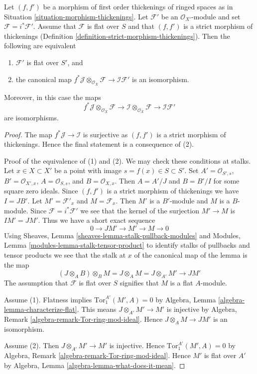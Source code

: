 \begin{lemma}
\label{lemma-deform-module}
Let $(f, f')$ be a morphism of first order thickenings of ringed spaces
as in Situation \ref{situation-morphism-thickenings}.
Let $\mathcal{F}'$ be an $\mathcal{O}_{X'}$-module
and set $\mathcal{F} = i^*\mathcal{F}'$.
Assume that $\mathcal{F}$ is flat over $S$
and that $(f, f')$ is a strict morphism of thickenings
(Definition \ref{definition-strict-morphism-thickenings}).
Then the following are equivalent
\begin{enumerate}
\item $\mathcal{F}'$ is flat over $S'$, and
\item the canonical map
$f^*\mathcal{J} \otimes_{\mathcal{O}_X} \mathcal{F} \to
\mathcal{I}\mathcal{F}'$
is an isomorphism.
\end{enumerate}
Moreover, in this case the maps
$$
f^*\mathcal{J} \otimes_{\mathcal{O}_X} \mathcal{F} \to
\mathcal{I} \otimes_{\mathcal{O}_X} \mathcal{F} \to
\mathcal{I}\mathcal{F}'
$$
are isomorphisms.
\end{lemma}

\begin{proof}
The map $f^*\mathcal{J} \to \mathcal{I}$ is surjective
as $(f, f')$ is a strict morphism of thickenings.
Hence the final statement is a consequence of (2).

\medskip\noindent
Proof of the equivalence of (1) and (2). We may check these conditions
at stalks. Let $x \in X \subset X'$
be a point with image $s = f(x) \in S \subset S'$.
Set $A' = \mathcal{O}_{S', s}$, $B' = \mathcal{O}_{X', x}$,
$A = \mathcal{O}_{S, s}$, and $B = \mathcal{O}_{X, x}$.
Then $A = A'/J$ and $B = B'/I$ for some square zero ideals.
Since $(f, f')$ is a strict morphism of thickenings we have $I = JB'$.
Let $M' = \mathcal{F}'_x$ and $M = \mathcal{F}_x$.
Then $M'$ is a $B'$-module and $M$ is a $B$-module.
Since $\mathcal{F} = i^*\mathcal{F}'$ we see that the kernel of the
surjection $M' \to M$ is $IM' = JM'$. Thus we have a short exact
sequence
$$
0 \to JM' \to M' \to M \to 0
$$
Using
Sheaves, Lemma \ref{sheaves-lemma-stalk-pullback-modules}
and
Modules, Lemma \ref{modules-lemma-stalk-tensor-product}
to identify stalks of pullbacks and tensor products we see
that the stalk at $x$ of the canonical map of the lemma is the map
$$
(J \otimes_A B) \otimes_B M = J \otimes_A M = J \otimes_{A'} M'
\longrightarrow JM'
$$
The assumption that $\mathcal{F}$ is flat over $S$ signifies that
$M$ is a flat $A$-module.

\medskip\noindent
Assume (1). Flatness implies $\text{Tor}_1^{A'}(M', A) = 0$ by
Algebra, Lemma \ref{algebra-lemma-characterize-flat}.
This means $J \otimes_{A'} M' \to M'$ is injective by
Algebra, Remark \ref{algebra-remark-Tor-ring-mod-ideal}.
Hence $J \otimes_A M \to JM'$ is an isomorphism.

\medskip\noindent
Assume (2). Then $J \otimes_{A'} M' \to M'$ is injective. Hence
$\text{Tor}_1^{A'}(M', A) = 0$ by
Algebra, Remark \ref{algebra-remark-Tor-ring-mod-ideal}.
Hence $M'$ is flat over $A'$ by
Algebra, Lemma \ref{algebra-lemma-what-does-it-mean}.
\end{proof}

